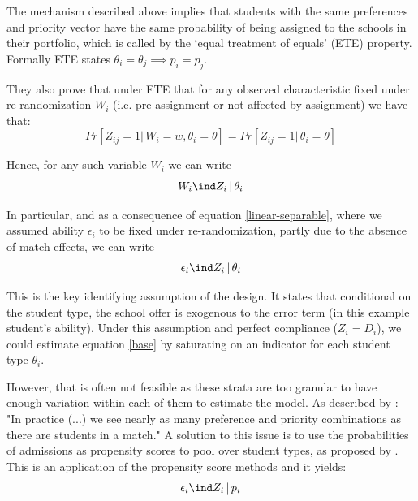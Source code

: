 \documentclass[a4paper, article, english, oneside, unknownkeysallowed, 12pt]{memoir}
\begin{document}
The mechanism described above implies that students with the same preferences and priority vector have the same probability of being assigned to the schools in their portfolio, which is called by \textcite{abdulkadiroglu_research_2017} the `equal treatment of equals' (ETE) property. 
Formally ETE states $\theta_i = \theta_j \implies p_i = p_j$. 

They also prove that under ETE that for any observed characteristic fixed under re-randomization $W_i$ (i.e. pre-assignment or not affected by assignment) we have that:
\begin{equation}
 Pr[Z_{ij} = 1|\, W_i = w, \theta_i = \theta] = Pr[Z_{ij} = 1 | \, \theta_i = \theta]  
\end{equation}

Hence, for any such variable $W_i$ we can write 
\begin{equation}
 W_i \ind Z_i \, | \, \theta_i 
 \label{w ind}  
\end{equation}

In particular, and as a consequence of equation \ref{linear-separable}, where we assumed ability $\epsilon_i$ to be fixed under re-randomization, partly due to the absence of match effects, we can write
\begin{equation}
  \epsilon_i \ind Z_i \, | \, \theta_i   
\end{equation}

This is the key identifying assumption of the design.
It states that conditional on the student type, the school offer is exogenous to the error term (in this example student's ability).
Under this assumption and perfect compliance ($Z_i = D_i$), we could estimate equation \ref{base} by saturating on an indicator for each student type $\theta_i$. 

However, that is often not feasible as these strata are too granular to have enough variation within each of them to estimate the model. 
As described by \textcite{angrist_credible_2024}: "In practice (...) we see nearly as many preference and priority combinations as there are students in a match."  
A solution to this issue is to use the probabilities of admissions as propensity scores to pool over student types, as proposed by \textcite{abdulkadiroglu_research_2017}. 
This is an application of the propensity score methods \parencite{rosenbaum_central_1983} and it yields:  
\begin{equation}
  \epsilon_i \ind Z_i \, | \, p_i 
  \label{CRA}
\end{equation}
\end{document}
